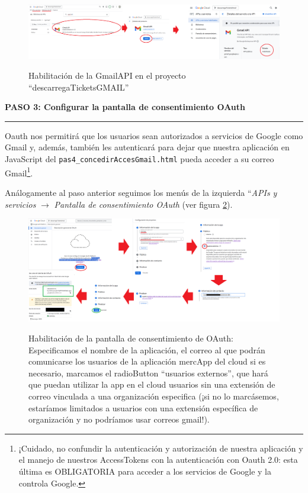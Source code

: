 \documentclass[a4paper,12pt]{report}
\begin{document}
	\FloatBarrier
	\setlength{\belowcaptionskip}{3pt}
	\begin{figure}[H]
		\centering
		\caption{Habilitación de la GmailAPI en el proyecto ``descarregaTicketsGMAIL''}
		\includegraphics[width=1\linewidth]{img/googleCloudC.png}
		\label{fig:googleCloudC}
	\end{figure}
	\FloatBarrier
	
	\noindent \textbf{PASO 3: Configurar la pantalla de consentimiento OAuth}
	\vspace{.1em}
	\hrule
	\vspace{.5em}
	
	Oauth nos permitirá que los usuarios sean autorizados a servicios de Google como Gmail y, además, también les autenticará para dejar que nuestra aplicación en JavaScript del \texttt{pas4\_concedirAccesGmail.html} pueda acceder a su correo Gmail\footnote{¡Cuidado, no confundir la autenticación y autorización de nuestra aplicación y el manejo de nuestros AccessTokens con la autenticación con Oauth 2.0: esta última es OBLIGATORIA para acceder a los servicios de Google y la controla Google.}.
	
	Análogamente al paso anterior seguimos los menús de la izquierda ``\textit{APIs y servicios} $\rightarrow$ \textit{Pantalla de consentimiento OAuth} (ver figura \ref{fig:googleCloudD}).
	
	\FloatBarrier
	\setlength{\belowcaptionskip}{3pt}
	\begin{figure}[H]
		\centering
		\caption{Habilitación de la pantalla de consentimiento de OAuth: Especificamos el nombre de la aplicación, el correo al que podrán comunicarse los usuarios de la aplicación mercApp del cloud si es necesario, marcamos el radioButton ``usuarios externos'', que hará que puedan utilizar la app en el cloud usuarios sin una extensión de correo vinculada a una organización especifica (¡si no lo marcásemos, estaríamos limitados a usuarios con una extensión específica de organización y no podríamos usar correos gmail!).}
		\includegraphics[width=1\linewidth]{img/googleCloudD.png}
		\label{fig:googleCloudD}
	\end{figure}
	\FloatBarrier
	
\end{document}
